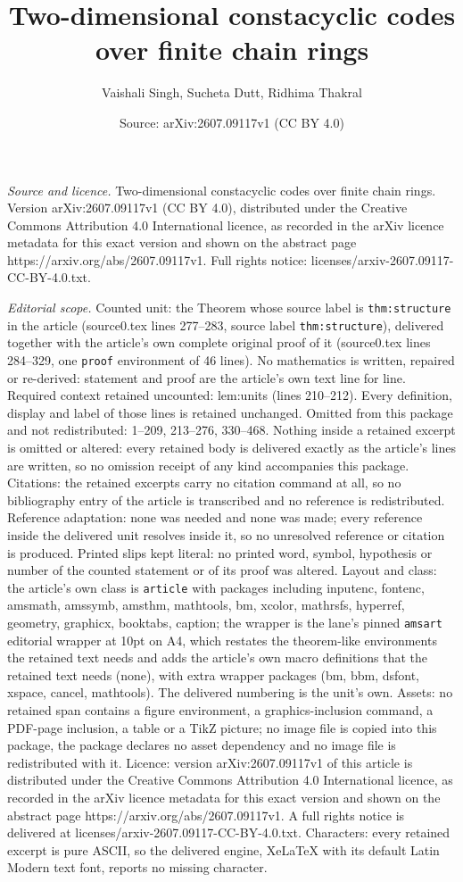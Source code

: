 \documentclass[10pt,a4paper]{amsart}
\title[Two-dimensional constacyclic codes over finite chain rings]{Two-dimensional constacyclic codes over finite chain rings}
\author{Vaishali Singh, Sucheta Dutt, Ridhima Thakral}
\date{Source: arXiv:2607.09117v1 (CC BY 4.0)}
\begin{document}
\maketitle

\noindent\emph{Source and licence.} Two-dimensional constacyclic codes over finite chain rings. Version arXiv:2607.09117v1 (CC BY 4.0), distributed under the Creative Commons Attribution 4.0 International licence, as recorded in the arXiv licence metadata for this exact version and shown on the abstract page https://arxiv.org/abs/2607.09117v1. Full rights notice: licenses/arxiv-2607.09117-CC-BY-4.0.txt.\par\smallskip

\noindent\textit{Editorial scope.} Counted unit: the Theorem whose source label is \texttt{thm:structure} in the article (source0.tex lines 277--283, source label \texttt{thm:structure}), delivered together with the article's own complete original proof of it (source0.tex lines 284--329, one \texttt{proof} environment of 46 lines). No mathematics is written, repaired or re-derived: statement and proof are the article's own text line for line. Required context retained uncounted: lem:units (lines 210--212). Every definition, display and label of those lines is retained unchanged. Omitted from this package and not redistributed: 1--209, 213--276, 330--468. Nothing inside a retained excerpt is omitted or altered: every retained body is delivered exactly as the article's lines are written, so no omission receipt of any kind accompanies this package. Citations: the retained excerpts carry no citation command at all, so no bibliography entry of the article is transcribed and no reference is redistributed. Reference adaptation: none was needed and none was made; every reference inside the delivered unit resolves inside it, so no unresolved reference or citation is produced. Printed slips kept literal: no printed word, symbol, hypothesis or number of the counted statement or of its proof was altered. Layout and class: the article's own class is \texttt{article} with packages including inputenc, fontenc, amsmath, amssymb, amsthm, mathtools, bm, xcolor, mathrsfs, hyperref, geometry, graphicx, booktabs, caption; the wrapper is the lane's pinned \texttt{amsart} editorial wrapper at 10pt on A4, which restates the theorem-like environments the retained text needs and adds the article's own macro definitions that the retained text needs (none), with extra wrapper packages (bm, bbm, dsfont, xspace, cancel, mathtools). The delivered numbering is the unit's own. Assets: no retained span contains a figure environment, a graphics-inclusion command, a PDF-page inclusion, a table or a TikZ picture; no image file is copied into this package, the package declares no asset dependency and no image file is redistributed with it. Licence: version arXiv:2607.09117v1 of this article is distributed under the Creative Commons Attribution 4.0 International licence, as recorded in the arXiv licence metadata for this exact version and shown on the abstract page https://arxiv.org/abs/2607.09117v1. A full rights notice is delivered at licenses/arxiv-2607.09117-CC-BY-4.0.txt. Characters: every retained excerpt is pure ASCII, so the delivered engine, XeLaTeX with its default Latin Modern text font, reports no missing character.
\end{document}
